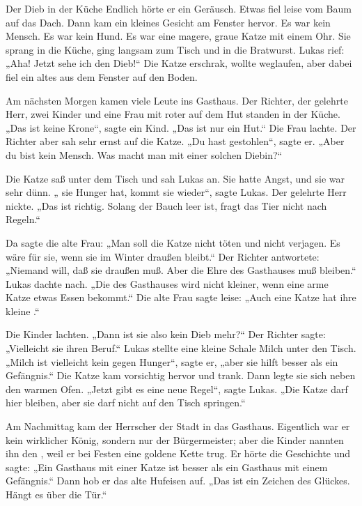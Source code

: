 \documentclass[12pt]{nextbook}
\begin{document}
\begin{readersection}{Der Dieb in der Küche}
Endlich hörte er ein Geräusch. Etwas fiel leise vom Baum auf das Dach. Dann kam ein kleines Gesicht am Fenster hervor. Es war kein Mensch. Es war kein Hund. Es war eine magere, graue Katze mit einem  Ohr. Sie sprang in die Küche, ging langsam zum Tisch und  in die Bratwurst. Lukas rief: „Aha! Jetzt sehe ich den Dieb!“ Die Katze erschrak, wollte weglaufen, aber dabei fiel ein altes  aus dem Fenster auf den Boden.

Am nächsten Morgen kamen viele Leute ins Gasthaus. Der Richter, der gelehrte Herr, zwei Kinder und eine Frau mit roter  auf dem Hut standen in der Küche. „Das ist keine Krone“, sagte ein Kind. „Das ist nur ein Hut.“ Die Frau lachte. Der Richter aber sah sehr ernst auf die Katze. „Du hast gestohlen“, sagte er. „Aber du bist kein Mensch. Was macht man mit einer solchen Diebin?“

Die Katze saß unter dem Tisch und sah Lukas an. Sie hatte Angst, und sie war sehr dünn. „ sie Hunger hat, kommt sie wieder“, sagte Lukas. Der gelehrte Herr nickte. „Das ist richtig. Solang der Bauch leer ist, fragt das Tier nicht nach Regeln.“

Da sagte die alte Frau: „Man soll die Katze nicht töten und nicht verjagen. Es wäre  für sie, wenn sie im Winter draußen bleibt.“ Der Richter antwortete: „Niemand will, daß sie draußen  muß. Aber die Ehre des Gasthauses muß bleiben.“ Lukas dachte nach. „Die  des Gasthauses wird nicht kleiner, wenn eine arme Katze etwas Essen bekommt.“ Die alte Frau sagte leise: „Auch eine Katze hat ihre kleine .“

Die Kinder lachten. „Dann ist sie also kein Dieb mehr?“ Der Richter sagte: „Vielleicht  sie ihren Beruf.“ Lukas stellte eine kleine Schale Milch unter den Tisch. „Milch ist vielleicht kein  gegen Hunger“, sagte er, „aber sie hilft besser als ein Gefängnis.“ Die Katze kam vorsichtig hervor und trank. Dann legte sie sich neben den warmen Ofen. „Jetzt gibt es eine neue Regel“, sagte Lukas. „Die Katze darf hier bleiben, aber sie darf nicht auf den Tisch springen.“

Am Nachmittag kam der Herrscher der Stadt in das Gasthaus. Eigentlich war er kein wirklicher König, sondern nur der Bürgermeister; aber die Kinder nannten ihn den , weil er bei Festen eine goldene Kette trug. Er hörte die Geschichte und sagte: „Ein Gasthaus mit einer Katze ist besser als ein Gasthaus mit einem Gefängnis.“ Dann hob er das alte Hufeisen auf. „Das ist ein Zeichen des Glückes. Hängt es über die Tür.“


\end{readersection}
\end{document}
